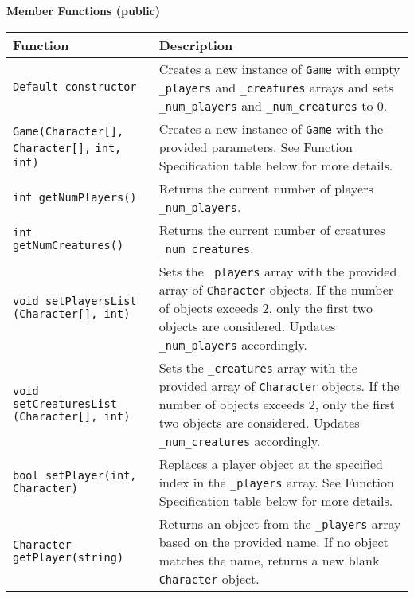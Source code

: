 \textbf{Member Functions (public)}

\renewcommand{\arraystretch}{1.5} 
\begin{longtable}{|p{2.0in}|p{4.0in}|}
\hline
\textbf{Function} & \textbf{Description} \\ \hline

\texttt{Default constructor} & Creates a new instance of \texttt{Game} with empty \texttt{_players} and \texttt{_creatures} arrays and sets \texttt{_num_players} and \texttt{_num_creatures} to 0. \\ \hline

\texttt{Game(Character[], Character[],} \newline \texttt{int, int)} & Creates a new instance of \texttt{Game} with the provided parameters. See Function Specification table below for more details. \\ \hline

\texttt{int getNumPlayers()} & Returns the current number of players \texttt{_num_players}. \\ \hline

\texttt{int getNumCreatures()} & Returns the current number of creatures \texttt{_num_creatures}. \\ \hline

\texttt{void setPlayersList} \newline \texttt{(Character[], int)} & Sets the \texttt{_players} array with the provided array of \texttt{Character} objects. If the number of objects exceeds 2, only the first two objects are considered. Updates \texttt{_num_players} accordingly. \\ \hline

\texttt{void setCreaturesList} \newline \texttt{(Character[], int)} & Sets the \texttt{_creatures} array with the provided array of \texttt{Character} objects. If the number of objects exceeds 2, only the first two objects are considered. Updates \texttt{_num_creatures} accordingly. \\ \hline

\texttt{bool setPlayer(int, Character)} & Replaces a player object at the specified index in the \texttt{_players} array. See Function Specification table below for more details. \\ \hline

\texttt{Character getPlayer(string)} & Returns an object from the \texttt{_players} array based on the provided name. If no object matches the name, returns a new blank \texttt{Character} object. \\ \hline


\end{longtable}
